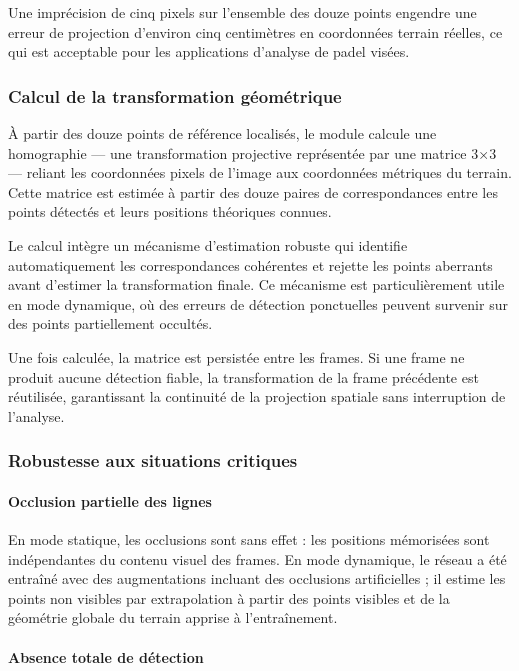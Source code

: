 Une imprécision de cinq pixels sur l'ensemble des douze points engendre une erreur de projection d'environ cinq centimètres en coordonnées terrain réelles, ce qui est acceptable pour les applications d'analyse de padel visées.

\subsubsection{Calcul de la transformation géométrique}

À partir des douze points de référence localisés, le module calcule une homographie — une transformation projective représentée par une matrice 3×3 — reliant les coordonnées pixels de l'image aux coordonnées métriques du terrain. Cette matrice est estimée à partir des douze paires de correspondances entre les points détectés et leurs positions théoriques connues.

Le calcul intègre un mécanisme d'estimation robuste qui identifie automatiquement les correspondances cohérentes et rejette les points aberrants avant d'estimer la transformation finale. Ce mécanisme est particulièrement utile en mode dynamique, où des erreurs de détection ponctuelles peuvent survenir sur des points partiellement occultés.

Une fois calculée, la matrice est persistée entre les frames. Si une frame ne produit aucune détection fiable, la transformation de la frame précédente est réutilisée, garantissant la continuité de la projection spatiale sans interruption de l'analyse.

\subsubsection{Robustesse aux situations critiques}

\paragraph{Occlusion partielle des lignes}

En mode statique, les occlusions sont sans effet : les positions mémorisées sont indépendantes du contenu visuel des frames. En mode dynamique, le réseau a été entraîné avec des augmentations incluant des occlusions artificielles ; il estime les points non visibles par extrapolation à partir des points visibles et de la géométrie globale du terrain apprise à l'entraînement.

\paragraph{Absence totale de détection}

